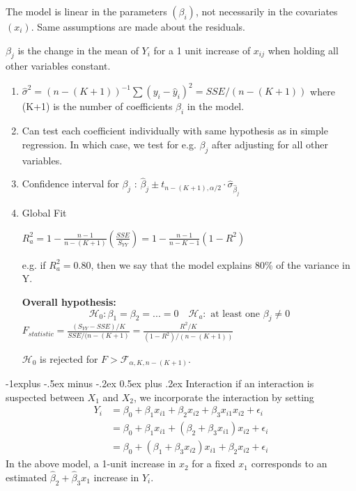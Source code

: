 \documentclass[8pt,landscape]{article}
\makeatletter
\renewcommand{\subsection}{\@startsection{subsection}{2}{0mm}%
                                {-1explus -.5ex minus -.2ex}%
                                {0.5ex plus .2ex}%
                                {\normalfont\normalsize\bfseries}}
\makeatother
\begin{document}
\begin{multicols}{3}
The model is linear in the parameters $(\beta_i)$, not necessarily in the covariates $(x_i)$. Same assumptions are made about the residuals. 

$\beta_j$ is the change in the mean of $Y_i$ for a 1 unit increase of $x_{ij}$ when holding all other variables constant.

\begin{enumerate}
\item $\hat{\sigma}^2 = (n - (K+1)) ^{-1} \sum (y_i -\hat{y}_i)^2 = SSE/(n-(K+1))$ where (K+1) is the number of coefficients $\beta_i$ in the model. 
\item Can test each coefficient individually with same hypothesis as in simple regression. In which case, we test for e.g. $\beta_j$ after adjusting for all other variables.
\item Confidence interval for $\beta_j$ : $\hat{\beta}_j \pm t_{n-(K+1), \alpha/2} \cdot \hat{\sigma}_{\hat{\beta}_j}$
\item Global Fit

$R^2_a = 1 - \frac{n-1}{n-(K+1)}\left(\frac{SSE}{S_{YY}}\right) = 1 - \frac{n-1}{n-K-1}(1-R^2) $

e.g. if $R^2_a = 0.80$, then we say that the model explains 80\% of the variance in Y.

\textbf{Overall hypothesis:}
$$\mathcal{H}_0 : \beta_1 = \beta_2 = ... = 0 \quad \mathcal{H}_a : \text{ at least one } \beta_j \neq 0$$
$F_{statistic} = \frac{(S_{YY} - SSE ) /K }{SSE/(n-(K+1)} = \frac{R^2/ K}{(1-R^2)/(n-(K+1))}$

$\mathcal{H}_0$ is rejected for $F> \mathcal{F}_{\alpha, K, n-(K+1)}$.

\end{enumerate}
\subsection{Interaction}
if an interaction is suspected between $X_1$ and $X_2$, we incorporate the interaction by setting
\begin{align*}
Y_i &= \beta_0 + \beta_1x_{i1} + \beta_2x_{i2} + \beta_3 x_{i1} x_{i2} + \epsilon_i \\ 
	&= \beta_0 + \beta_1x_{i1} +(\beta_2 + \beta_3x_{i1})x_{i2} + \epsilon_i \\
	&= \beta_0 + (\beta_1 +\beta_3x_{i2})x_{i1} + \beta_2 x_{i2}+ \epsilon_i 
\end{align*}
In the above model, a 1-unit increase in $x_2$ for a fixed $x_1$ corresponds to an estimated $\hat{\beta}_2 + \hat{\beta}_3 x_1$ increase in $Y_i$.


\end{multicols}
\end{document}

